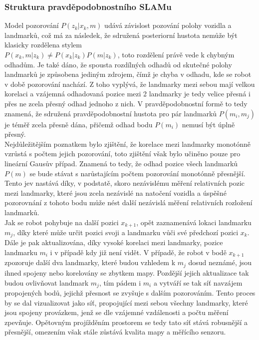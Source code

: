 \documentclass[11pt]{article}
\begin{document}
\subsubsection{Struktura pravděpodobnostního SLAMu}
Model pozorování $P(z_k|x_k,m)$ udává závislost pozování polohy vozidla a landmarků, což má za následek, že sdružená posteriorní hustota nemůže být klasicky rozdělena stylem \\$P(x_k,m|z_k)\neq P(x_k|z_k)P(m|z_k)$, toto rozdělení právě vede k chybným odhadům. Je také dáno, že spousta rozdílných odhadů od skutečné polohy landmarků je způsobena jediným zdrojem, čímž je chyba v odhadu, kde se robot v době pozorování nachází. Z toho vyplývá, že landmarky mezi sebou mají velkou korelaci a vzájemná odhadovaná pozice mezi 2 landmarky je tedy velice přesná i přes ne zcela přesný odhad jednoho z nich. V pravděpodobnostní formě to tedy znamená, že sdružená pravděpodobnostní hustota pro pár landmarků $P(m_i,m_j)$ je téměř zcela přesně dána, přičemž odhad bodu $P(m_i)$ nemusí být úplně přesný.\\
\indent Nejdůležitějším poznatkem bylo zjištění, že korelace mezi landmarky monotónně vzrůstá s počtem jejich pozorování, toto zjištění však bylo učiněno pouze pro lineární Gausův případ. Znamená to tedy, že odhad pozice všech landmarků $P(m)$ se bude stávat s narůstajícím počtem pozorování monotónně přesnější. Tento jev nastává díky, v podstatě, skoro nezávislému měření relativních pozic mezi landmarky, které jsou zcela nezávislé na natočení vozidla a úspěšné pozorovnání z tohoto bodu může nést další nezávislá měření relativních rozložení landmarků. \\
\indent Jak se robot pohybuje na další pozici $x_{k+1}$, opět zaznamenává lokaci landmarku $m_j$, díky které může určit pozici svoji a landmarku vůči své předchozí pozici $x_k$. Dále je pak aktualizována, díky vysoké korelaci mezi landmarky, pozice landmarku $m_i$ i v případě kdy již není vidět. V případě, že robot v bodě $x_{k+1}$ zpozoruje další dva landmarky, které budou vzhledem k $m_j$ dosud neznámé, jsou ihned spojeny nebo korelovány se zbytkem mapy. Pozdější jejich aktualizace tak budou ovlivňovat landmark $m_j$, tím pádem i $m_i$ a vytváří se tak síť navzájem propojených bodů, jejichž přesnost se zvyšuje s dalším pozorováním. Tento proces by se dal vizualizovat jako síť, propojující mezi sebou všechny landmarky, které jsou spojeny provázkem, jenž se dle vzájemné vzdálenosti a počtu měření zpevňuje. Opětovným projížděním prostorem se tedy tato síť stává robusnější a přesnější, omezením však stále zůstává kvalita mapy a měřícího senzoru.
\end{document}
